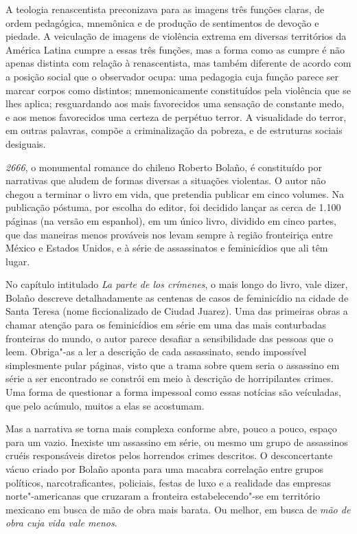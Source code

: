 A teologia renascentista preconizava para as imagens três funções
claras, de ordem pedagógica, mnemônica e de produção de sentimentos de
devoção e piedade. A veiculação de imagens de violência extrema em
diversas territórios da América Latina cumpre a essas três funções, mas
a forma como as cumpre é não apenas distinta com relação à
renascentista, mas também diferente de acordo com a posição
social que o observador ocupa: uma pedagogia cuja função parece ser
marcar corpos como distintos; mnemonicamente constituídos pela violência
que se lhes aplica; resguardando aos mais favorecidos uma sensação de
constante medo, e aos menos favorecidos uma certeza de perpétuo terror.
A visualidade do terror, em outras palavras, compõe a criminalização da
pobreza, e de estruturas sociais desiguais.

\asterisc

\emph{2666}, o monumental romance do chileno Roberto Bolaño, é
constituído por narrativas que aludem de formas diversas a situações
violentas. O autor não chegou a terminar o livro em vida, que pretendia
publicar em cinco volumes. Na publicação póstuma, por escolha do editor,
foi decidido lançar as cerca de 1.100 páginas (na versão em espanhol),
em um único livro, dividido em cinco partes, que das maneiras menos
prováveis nos levam sempre à região fronteiriça entre México e Estados
Unidos, e à série de assassinatos e feminicídios que ali têm lugar.

No capítulo intitulado \emph{La parte de los crímenes}, o mais longo do
livro, vale dizer, Bolaño descreve detalhadamente as centenas de casos
de feminicídio na cidade de Santa Teresa (nome ficcionalizado de Ciudad
Juarez). Uma das primeiras obras a chamar atenção para os feminicídios
em série em uma das mais conturbadas fronteiras do mundo, o autor parece
desafiar a sensibilidade das pessoas que o leem. Obriga"-as a ler a
descrição de cada assassinato, sendo impossível simplesmente pular
páginas, visto que a trama sobre quem seria o assassino em série a ser
encontrado se constrói em meio à descrição de horripilantes crimes. Uma
forma de questionar a forma impessoal como essas notícias são
veículadas, que pelo acúmulo, muitos a elas se acostumam.

Mas a narrativa se torna mais complexa conforme abre, pouco a pouco,
espaço para um vazio. Inexiste um assassino em série, ou mesmo um grupo
de assassinos cruéis responsáveis diretos pelos horrendos crimes
descritos. O desconcertante vácuo criado por Bolaño aponta para uma
macabra correlação entre grupos políticos, narcotraficantes, policiais,
festas de luxo e a realidade das empresas norte"-americanas que cruzaram
a fronteira estabelecendo"-se em território mexicano em busca de mão de obra
mais barata. Ou melhor, em busca de \emph{mão de obra cuja vida vale
menos}.

